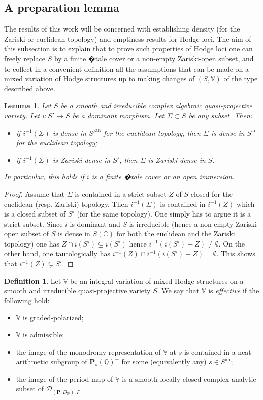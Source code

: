 \documentclass[10pt]{article}
\numberwithin{equation}{subsection}
\theoremstyle{plain}
\newtheorem{lemma}[theorem]{Lemma}
\theoremstyle{definition}
\newtheorem{definition}[theorem]{Definition}
\theoremstyle{remark}
\newcommand{\Q}{\mathbb Q}
\newcommand{\C}{\mathbb C}
\newcommand{\V}{\mathbb V}
\newcommand{\pp}{\mathbf P}
\newcommand{\an}{\mathrm{an}}
\newcommand{\period}{\mathscr{D}}
\begin{document}
\subsection{A preparation lemma}
The results of this work will be concerned with establishing density (for the Zariski or euclidean topology) and emptiness results for Hodge loci. The aim of this subsection is to explain that to prove such properties of Hodge loci one can freely replace $S$ by a finite �tale cover or a non-empty Zariski-open subset, and to collect in a convenient definition all the assumptions that can be made on a mixed variation of Hodge structures up to making changes of $(S,\V)$ of the type described above.
\begin{lemma}\label{stabdens}
Let $S$ be a smooth and irreducible complex algebraic quasi-projective variety. Let $i : S' \rightarrow S$ be a dominant morphism. Let $\Sigma \subset S$ be any subset. Then:
\begin{itemize}
\item[(i)] if $i^{-1}(\Sigma)$ is dense in $S'^\an$ for the euclidean topology, then $\Sigma$ is dense in $S^\an$ for the euclidean topology;
\item[(ii)] if $i^{-1}(\Sigma)$ is Zariski dense in $S'$, then $\Sigma$ is Zariski dense in $S$.
\end{itemize}
In particular, this holds if $i$ is a finite �tale cover or an open immersion.
\end{lemma}
\begin{proof}
Assume that $\Sigma$ is contained in a strict subset $Z$ of $S$ closed for the euclidean (resp. Zariski) topology. Then $i^{-1}(\Sigma)$ is contained in $i^{-1}(Z)$ which is a closed subset of $S'$ (for the same topology). One simply has to argue it is a strict subset. Since $i$ is dominant and $S$ is irreducible (hence a non-empty Zariski open subset of $S$ is dense in $S(\C)$ for both the euclidean and the Zariski topology) one has $Z \cap i(S') \subsetneq i(S')$ hence $i^{-1}(i(S')-Z) \neq \emptyset$. On the other hand, one tautologically has $i^{-1}(Z) \cap i^{-1}(i(S')-Z) = \emptyset$. This shows that $i^{-1}(Z) \subsetneq S'$.
\end{proof}
\begin{definition}
Let $\V$ be an integral variation of mixed Hodge structures on a smooth and irreducible quasi-projective variety $S$. We say that $\V$ is \textit{effective} if the following hold:
\begin{itemize}
\item[(a)] $\V$ is graded-polarized;
\item[(b)] $\V$ is admissible;
\item[(c)] the image of the monodromy representation of $\V$ at $s$ is contained in a neat arithmetic subgroup of $\pp_s(\Q)^+$ for some (equivalently any) $s \in S^\an$;
\item[(d)] the image of the period map of $\V$ is a smooth locally closed complex-analytic subset of $\period_{(\pp, D_\pp), \Gamma}$.
\end{itemize}
\end{definition}
\end{document}
